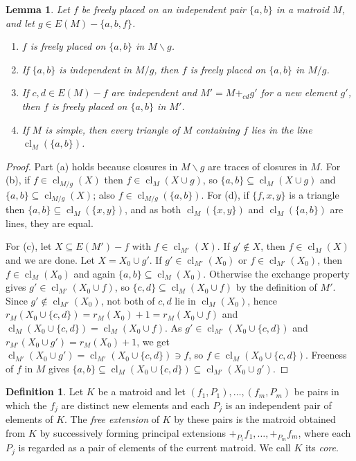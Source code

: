 \documentclass[11pt]{amsart}
\newtheorem{lemma}[theorem]{Lemma}
\theoremstyle{definition}
\newtheorem{definition}[theorem]{Definition}
\theoremstyle{remark}
\numberwithin{equation}{section}
\newcommand{\cl}{\operatorname{cl}}
\begin{document}
\begin{lemma}\label{lem:free}
Let $f$ be freely placed on an independent pair $\{a,b\}$ in a matroid $M$, and let $g\in E(M)-\{a,b,f\}$.
\begin{enumerate}[label=\textup{(\alph*)}]
\item $f$ is freely placed on $\{a,b\}$ in $M\backslash g$.
\item If $\{a,b\}$ is independent in $M/g$, then $f$ is freely placed on $\{a,b\}$ in $M/g$.
\item If $c,d\in E(M)-f$ are independent and $M'=M+_{cd}g'$ for a new element $g'$, then $f$ is freely placed on $\{a,b\}$ in $M'$.
\item If $M$ is simple, then every triangle of $M$ containing $f$ lies in the line $\cl_M(\{a,b\})$.
\end{enumerate}
\end{lemma}

\begin{proof}
Part (a) holds because closures in $M\backslash g$ are traces of closures in $M$. For (b), if $f\in\cl_{M/g}(X)$ then $f\in\cl_M(X\cup g)$, so $\{a,b\}\subseteq\cl_M(X\cup g)$ and $\{a,b\}\subseteq\cl_{M/g}(X)$; also $f\in\cl_{M/g}(\{a,b\})$. For (d), if $\{f,x,y\}$ is a triangle then $\{a,b\}\subseteq\cl_M(\{x,y\})$, and as both $\cl_M(\{x,y\})$ and $\cl_M(\{a,b\})$ are lines, they are equal.

For (c), let $X\subseteq E(M')-f$ with $f\in\cl_{M'}(X)$. If $g'\notin X$, then $f\in\cl_M(X)$ and we are done. Let $X=X_0\cup g'$. If $g'\in\cl_{M'}(X_0)$ or $f\in\cl_{M'}(X_0)$, then $f\in\cl_M(X_0)$ and again $\{a,b\}\subseteq\cl_M(X_0)$. Otherwise the exchange property gives $g'\in\cl_{M'}(X_0\cup f)$, so $\{c,d\}\subseteq\cl_M(X_0\cup f)$ by the definition of $M'$. Since $g'\notin\cl_{M'}(X_0)$, not both of $c,d$ lie in $\cl_M(X_0)$, hence $r_M(X_0\cup\{c,d\})=r_M(X_0)+1=r_M(X_0\cup f)$ and $\cl_M(X_0\cup\{c,d\})=\cl_M(X_0\cup f)$. As $g'\in\cl_{M'}(X_0\cup\{c,d\})$ and $r_{M'}(X_0\cup g')=r_M(X_0)+1$, we get $\cl_{M'}(X_0\cup g')=\cl_{M'}(X_0\cup\{c,d\})\ni f$, so $f\in\cl_M(X_0\cup\{c,d\})$. Freeness of $f$ in $M$ gives $\{a,b\}\subseteq\cl_M(X_0\cup\{c,d\})\subseteq\cl_{M'}(X_0\cup g')$.
\end{proof}

\begin{definition}\label{def:freemodel}
Let $K$ be a matroid and let $(f_1,P_1),\dots,(f_m,P_m)$ be pairs in which the $f_j$ are distinct new elements and each $P_j$ is an independent pair of elements of $K$. The \emph{free extension} of $K$ by these pairs is the matroid obtained from $K$ by successively forming principal extensions $+_{P_1}f_1,\dots,+_{P_m}f_m$, where each $P_j$ is regarded as a pair of elements of the current matroid. We call $K$ its \emph{core}.
\end{definition}
\end{document}
